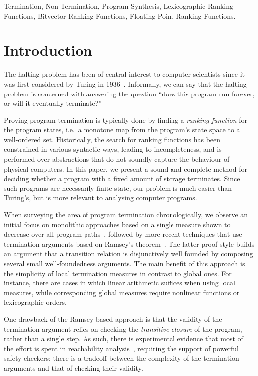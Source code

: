 \documentclass[preprint]{sigplanconf}
\theoremstyle{definition}
\begin{document}

\keywords
Termination, Non-Termination, Program Synthesis,
Lexicographic Ranking Functions, Bitvector Ranking Functions, Floating-Point Ranking Functions.

\section{Introduction}\label{sec:intro}

The halting problem has been of central interest to computer scientists
since it was first considered by Turing in 1936~\cite{turing}.  Informally,
we can say that the halting problem is concerned with answering the question
``does this program run forever, or will it eventually terminate?''

Proving program termination is typically done by finding a \emph{ranking
function} for the program states, i.e.~a monotone map from the program's
state space to a well-ordered set.  Historically, the search for ranking
functions has been constrained in various syntactic ways, leading to
incompleteness, and is performed over abstractions that do not soundly
capture the behaviour of physical computers.  In this paper, we present a
sound and complete method for deciding whether a program with a fixed amount of
storage terminates.  Since such programs are necessarily finite state, our
problem is much easier than Turing's, but is more relevant to analysing computer
programs.

When surveying the area of program termination chronologically, we observe
an initial focus on monolithic approaches based on a single measure shown to
decrease over all program
paths~\cite{DBLP:conf/vmcai/P04,DBLP:conf/cav/BradleyMS05}, followed by more
recent techniques that use termination arguments based on Ramsey's
theorem~\cite{DBLP:conf/lpe/CodishG03,DBLP:conf/lics/PodelskiR04,DBLP:conf/pldi/CookPR06}.
The latter proof style builds an argument that a transition relation is disjunctively well founded
by composing several small well-foundedness arguments.
The main benefit of this approach is
the simplicity of local termination measures in contrast to global ones. 
For instance, there are cases in which linear arithmetic suffices when using
local measures, while corresponding global measures require nonlinear
functions or lexicographic orders.

One drawback of the Ramsey-based approach is that the validity of the
termination argument relies on checking the \emph{transitive closure} of the
program, rather than a single step.  As such, there is experimental evidence
that most of the effort is spent in reachability
analysis~\cite{DBLP:conf/pldi/CookPR06,DBLP:conf/cav/KroeningSTW10},
requiring the support of powerful safety checkers: there is a tradeoff
between the complexity of the termination arguments and that of checking
their validity.
\end{document}
